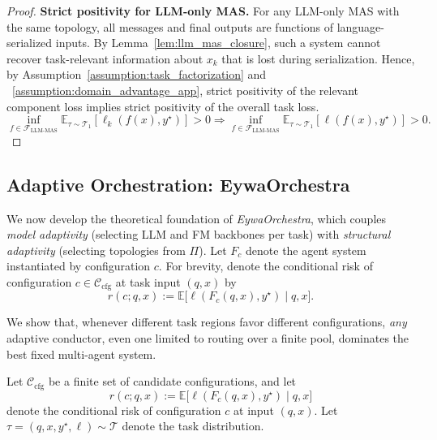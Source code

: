 \documentclass{llmxive}
\begin{document}
{\begin{proof}
\textbf{Strict positivity for LLM-only MAS.} For any LLM-only MAS with the same topology, all messages and final outputs are functions of language-serialized inputs. By Lemma~\ref{lem:llm_mas_closure}, such a system cannot recover task-relevant information about $x_k$ that is lost during serialization. Hence, by Assumption~\ref{assumption:task_factorization} and ~\ref{assumption:domain_advantage_app}, strict positivity of the relevant component loss implies strict positivity of the overall task loss.
\begin{equation}
\inf_{f\in\mathcal{F}_{\mathrm{LLM\text{-}MAS}}}
\mathbb{E}_{\tau\sim\mathcal{T}_1}
[\ell_k(f(x),y^\star)] > 0
\Longrightarrow
\inf_{f\in\mathcal{F}_{\mathrm{LLM\text{-}MAS}}}
\mathbb{E}_{\tau\sim\mathcal{T}_1}[\ell(f(x),y^\star)] > 0.
\end{equation}
\end{proof}



\subsection{Adaptive Orchestration: EywaOrchestra}
\label{app:orchestra}

We now develop the theoretical foundation of \textit{EywaOrchestra}, which couples \emph{model adaptivity} (selecting LLM and FM backbones per task) with \emph{structural adaptivity} (selecting topologies from $\Pi$). Let $F_c$ denote the agent system instantiated by configuration $c$. For brevity, denote the conditional risk of configuration $c\in\mathcal{C}_{\mathrm{cfg}}$ at task input $(q,x)$ by
\begin{equation}
r(c;q,x):=\mathbb{E}\big[\ell(F_c(q,x),y^\star)\mid q,x\big].
\end{equation}


We show that,  whenever different task regions favor different configurations, \emph{any} adaptive conductor, even one limited to routing over a finite pool, dominates the best fixed multi-agent system.

\begin{theorem}
\label{thm:orchestra_oracle}
Let $\mathcal{C}_{\mathrm{cfg}}$ be a finite set of candidate configurations, and let
\[
r(c;q,x):=\mathbb{E}\big[\ell(F_c(q,x),y^\star)\mid q,x\big]
\]
denote the conditional risk of configuration $c$ at input $(q,x)$. Let $\tau=(q,x,y^\star,\ell)\sim\mathcal{T}$ denote the task distribution.


\end{theorem}}
\end{document}
